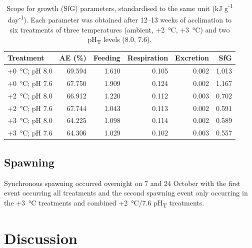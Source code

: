 \documentclass[a4paper,10pt, oneside]{memoir}
\begin{document}
\begin{table}[tb]

\caption[Scope for growth (SfG) parameters, standardised to the same unit (kJ g\textsuperscript{-1} day\textsuperscript{-1}).]{\label{sfgtab}Scope for growth (SfG) parameters, standardised to the same unit (kJ g\textsuperscript{-1} day\textsuperscript{-1}). Each parameter was obtained after 12--13 weeks of acclimation to six treatments of three temperatures (ambient, +\SI{2}{\celsius}, +\SI{3}{\celsius}) and two pH\textsubscript{T} levels (8.0, 7.6).}
\centering
\begin{tabular}[t]{lrrrrr}
\toprule
Treatment & AE (\%) & Feeding & Respiration & Excretion & SfG\\
\midrule
+\SI{0}{\celsius}; pH 8.0 & 69.594 & 1.610 & 0.105 & 0.002 & 1.013\\
+\SI{0}{\celsius}; pH 7.6 & 67.750 & 1.909 & 0.124 & 0.002 & 1.167\\
+\SI{2}{\celsius}; pH 8.0 & 66.912 & 1.220 & 0.112 & 0.003 & 0.702\\
+\SI{2}{\celsius}; pH 7.6 & 67.744 & 1.043 & 0.113 & 0.002 & 0.591\\
+\SI{3}{\celsius}; pH 8.0 & 64.225 & 1.098 & 0.114 & 0.002 & 0.589\\
+\SI{3}{\celsius}; pH 7.6 & 64.306 & 1.029 & 0.102 & 0.003 & 0.557\\
\bottomrule
\end{tabular}
\end{table}

\hypertarget{spawning}{%
\subsection{Spawning}\label{spawning}}

Synchronous spawning occurred overnight on 7 and 24 October with the first event occurring all treatments and the second spawning event only occurring in the +\SI{3}{\celsius} treatments and combined +\SI{2}{\celsius}/7.6 \si{pH_T} treatments.

\hypertarget{discussion-1}{%
\section{Discussion}\label{discussion-1}}
\end{document}
